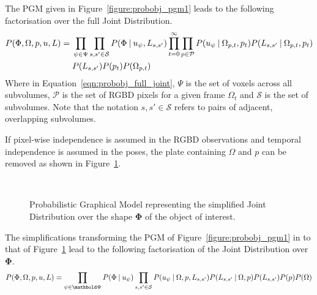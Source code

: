 The PGM given in Figure~\ref{figure:probobj_pgm1} leads to the following
factorisation over the full Joint Distribution.
\begin{equation}
  \label{eqn:probobj_full_joint}
  \begin{split}
    P(\Phi, \Omega, p, u, L) ={}&
    \prod_{\psi \in \Psi}\prod_{s, s' \in \mathcal{S}}
    P(\Phi \:\vert\: u_{\psi}, L_{s, s'}) 
    \prod_{t=0}^{\infty}\prod_{p \in \mathcal{P}}
    P(u_{\psi} \:\vert\: \Omega_{p, t}, p_{t})
    P(L_{s, s'} \:\vert\: \Omega_{p, t}, p_{t})\\
    & P(L_{s, s'})P(p_{t})P(\Omega_{p, t})
  \end{split}
\end{equation}
Where in Equation~\ref{eqn:probobj_full_joint}, \( \Psi \) is the set of voxels
across all subvolumes, \(\mathcal{P}\) is the set of RGBD pixels for a given 
frame \(\Omega_{t}\) and \(\mathcal{S}\) is the set of subvolumes. Note that the 
notation \(s, s' \in \mathcal{S}\) refers to pairs of adjacent, overlapping 
subvolumes.

If pixel-wise independence is assumed in the RGBD observations and temporal
independence is assumed in the poses, the plate containing \( \Omega \) and \(p\) can
be removed as shown in Figure~\ref{figure:probobj_pgm2}.
\begin{figure}[!htbp]
  \centering
  \caption[Probabilistic Object Reconstruction Formulation II]
  {Probabilistic Graphical Model representing the simplified Joint
    Distribution over the shape \(\bm{\Phi}\) of the object of interest.}
~\label{figure:probobj_pgm2}
\end{figure}

The simplifications transforming the PGM of Figure~\ref{figure:probobj_pgm1} in to
that of Figure~\ref{figure:probobj_pgm2} lead to the following factorisation of the
Joint Distribution over \(\bm{\Phi}\).
\begin{equation}
  \label{eqn:probobj_simplified_joint}
  P(\Phi, \Omega, p, u, L) = 
  \prod_{\psi \in \bm{\Psi}}P(\Phi \given u_{\psi})
  \prod_{s, s' \in \mathcal{S}}P(u_{\psi} \given \Omega, p, L_{s, s'})
  P(L_{s, s'} \given \Omega, p) P(L_{s, s'})P(p)P(\Omega)
\end{equation}


